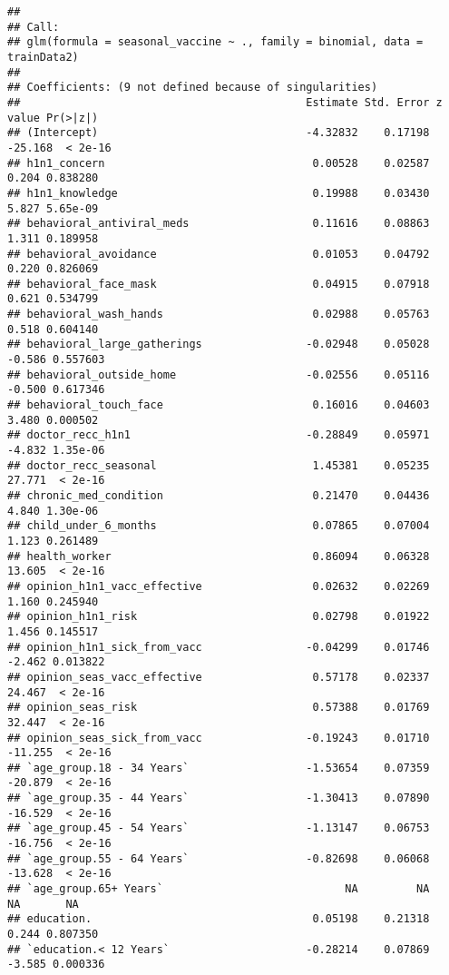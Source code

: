 \documentclass[
]{article}
\begin{document}
\begin{verbatim}
## 
## Call:
## glm(formula = seasonal_vaccine ~ ., family = binomial, data = trainData2)
## 
## Coefficients: (9 not defined because of singularities)
##                                            Estimate Std. Error z value Pr(>|z|)
## (Intercept)                                -4.32832    0.17198 -25.168  < 2e-16
## h1n1_concern                                0.00528    0.02587   0.204 0.838280
## h1n1_knowledge                              0.19988    0.03430   5.827 5.65e-09
## behavioral_antiviral_meds                   0.11616    0.08863   1.311 0.189958
## behavioral_avoidance                        0.01053    0.04792   0.220 0.826069
## behavioral_face_mask                        0.04915    0.07918   0.621 0.534799
## behavioral_wash_hands                       0.02988    0.05763   0.518 0.604140
## behavioral_large_gatherings                -0.02948    0.05028  -0.586 0.557603
## behavioral_outside_home                    -0.02556    0.05116  -0.500 0.617346
## behavioral_touch_face                       0.16016    0.04603   3.480 0.000502
## doctor_recc_h1n1                           -0.28849    0.05971  -4.832 1.35e-06
## doctor_recc_seasonal                        1.45381    0.05235  27.771  < 2e-16
## chronic_med_condition                       0.21470    0.04436   4.840 1.30e-06
## child_under_6_months                        0.07865    0.07004   1.123 0.261489
## health_worker                               0.86094    0.06328  13.605  < 2e-16
## opinion_h1n1_vacc_effective                 0.02632    0.02269   1.160 0.245940
## opinion_h1n1_risk                           0.02798    0.01922   1.456 0.145517
## opinion_h1n1_sick_from_vacc                -0.04299    0.01746  -2.462 0.013822
## opinion_seas_vacc_effective                 0.57178    0.02337  24.467  < 2e-16
## opinion_seas_risk                           0.57388    0.01769  32.447  < 2e-16
## opinion_seas_sick_from_vacc                -0.19243    0.01710 -11.255  < 2e-16
## `age_group.18 - 34 Years`                  -1.53654    0.07359 -20.879  < 2e-16
## `age_group.35 - 44 Years`                  -1.30413    0.07890 -16.529  < 2e-16
## `age_group.45 - 54 Years`                  -1.13147    0.06753 -16.756  < 2e-16
## `age_group.55 - 64 Years`                  -0.82698    0.06068 -13.628  < 2e-16
## `age_group.65+ Years`                            NA         NA      NA       NA
## education.                                  0.05198    0.21318   0.244 0.807350
## `education.< 12 Years`                     -0.28214    0.07869  -3.585 0.000336

\end{verbatim}
\end{document}
